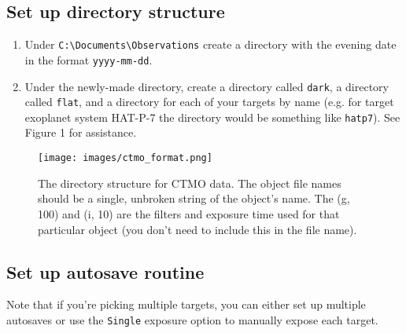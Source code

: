 \documentclass{article}
\begin{document}
	\subsection{Set up directory structure}

		\begin{enumerate}

			\item Under \texttt{C:\textbackslash Documents\textbackslash Observations} create a directory with the evening date in the format \texttt{yyyy-mm-dd}.

			\item Under the newly-made directory, create a directory called \texttt{dark}, a directory called \texttt{flat}, and a directory for each of your targets by name (e.g. for target exoplanet system HAT-P-7 the directory would be something like \texttt{hatp7}). See Figure 1 for assistance.

		\end{enumerate}

		\begin{figure}[h]
			\centering
			\texttt{[image: images/ctmo\_format.png]}
			\caption{The directory structure for CTMO data. The object file names should be a single, unbroken string of the object's name. The (g, 100) and (i, 10) are the filters and exposure time used for that particular object (you don't need to include this in the file name).}
		\end{figure}

	\subsection{Set up autosave routine}

		Note that if you're picking multiple targets, you can either set up multiple autosaves or use the \texttt{Single} exposure option to manually expose each target.
\end{document}
